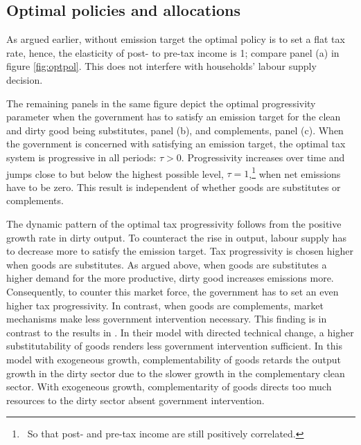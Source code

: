 \subsection{Optimal policies and allocations}
As argued earlier, without emission target the optimal policy is to set a flat tax rate, hence, the elasticity of post- to pre-tax income is 1; compare panel (a) in figure \ref{fig:optpol}. This does not interfere with households' labour supply decision.

The remaining panels in the same figure depict the optimal progressivity parameter when the government has to satisfy an emission target for the clean and dirty good being substitutes, panel (b), and complements, panel (c).
When the government is concerned with satisfying an emission target, the optimal tax system is progressive in all periods: $\tau >0$. Progressivity increases over time and jumps close to but below the highest  possible level, $\tau=1$,\footnote{\ So that post- and pre-tax income are still positively correlated.} when net emissions have to be zero. This result is independent of whether goods are substitutes or complements.   

The dynamic pattern of the optimal tax progressivity follows from the positive growth rate in dirty output. To counteract the rise in output, labour supply has to decrease more to satisfy the emission target. Tax progressivity is chosen higher when goods are substitutes. As argued above, when goods are substitutes a higher demand for the more productive, dirty good increases emissions more. Consequently, to counter this market force, the government has to set an even higher tax progressivity. In contrast, when goods are complements, market mechanisms make less government intervention necessary. 
This finding is in contrast to the results in \cite{Acemogxxx}. In their model with directed technical change, a higher substitutability of goods renders less government intervention sufficient. In this model with exogeneous growth, complementability of goods retards the output growth in the dirty sector due to the slower growth in the complementary clean sector. With exogeneous growth, complementarity of goods directs too much resources to the dirty sector absent government intervention. 


